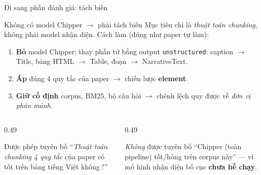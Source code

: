 \documentclass[aspectratio=169,11pt]{beamer}
\begin{document}
\begin{frame}{Đi sang phần đánh giá: tách biến}
  \begin{block}{\small Không có model Chipper $\rightarrow$ phải tách biến}
    \footnotesize Mục tiêu chỉ là \emph{thuật toán chunking}, không phải model nhận
    diện. Cách làm (đúng như paper tự làm):
    \begin{enumerate}\small
      \item \textbf{Bỏ} model Chipper; thay phần tử bằng output \texttt{unstructured}:
        caption $\rightarrow$ Title, bảng HTML $\rightarrow$ Table, đoạn $\rightarrow$ NarrativeText.
      \item \textbf{Áp} đúng 4 quy tắc của paper $\rightarrow$ chiến lược \textbf{element}.
      \item \textbf{Giữ cố định} corpus, BM25, bộ câu hỏi $\rightarrow$ chênh lệch
        quy được về \emph{đơn vị phân mảnh}.
    \end{enumerate}
  \end{block}
  \begin{columns}[T]
    \begin{column}{0.49\textwidth}
      \begin{block}{\small Được phép tuyên bố}
        ``\emph{Thuật toán chunking 4 quy tắc} của paper có tốt trên bảng tiếng
        Việt không\,?''
      \end{block}
    \end{column}
    \begin{column}{0.49\textwidth}
      \begin{alertblock}{\small \emph{Không} được tuyên bố}
        ``Chipper (toàn pipeline) tốt/hỏng trên corpus này'' — vì mô hình nhận diện
        bố cục \textbf{chưa hề chạy}.
      \end{alertblock}
    \end{column}
  \end{columns}
\end{frame}
\end{document}
